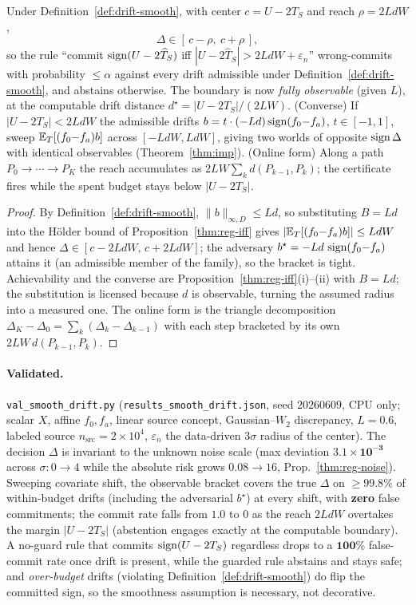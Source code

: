 \begin{proposition}\label{thm:smooth-drift}
Under Definition~\ref{def:drift-smooth}, with center $c=U-2T_S$ and reach
$\rho=2LdW$,
\[
\Delta\in[\,c-\rho,\ c+\rho\,],
\]
so the rule ``commit $\operatorname{sign}(U-2\widehat T_S)$ iff $|U-2\widehat T_S|>2LdW+
\varepsilon_n$'' wrong-commits with probability $\le\alpha$ against every drift
admissible under Definition~\ref{def:drift-smooth}, and abstains otherwise. The
boundary is now \emph{fully observable} (given $L$), at the computable drift
distance $d^\star=|U-2T_S|/(2LW)$. \textup{(Converse)} If $|U-2T_S|<2LdW$ the
admissible drifts $b=t\cdot(-Ld)\operatorname{sign}(f_0{-}f_a)$, $t\in[-1,1]$, sweep
$\mathbb{E}_T[(f_0{-}f_a)b]$ across $[-LdW,LdW]$, giving two worlds of opposite
$\operatorname{sign}\Delta$ with identical observables (Theorem~\ref{thm:imp}). \textup{(Online
form)} Along a path $P_0\!\to\!\cdots\!\to\!P_K$ the reach accumulates as
$2LW\sum_{k}d(P_{k-1},P_k)$; the certificate fires while the spent budget stays
below $|U-2T_S|$.
\end{proposition}
\begin{proof}
By Definition~\ref{def:drift-smooth}, $\|b\|_{\infty,D}\le Ld$, so substituting
$B=Ld$ into the H\"older bound of Proposition~\ref{thm:reg-iff} gives
$|\mathbb{E}_T[(f_0{-}f_a)b]|\le LdW$ and hence $\Delta\in[c-2LdW,\,c+2LdW]$; the
adversary $b^\star=-Ld\,\operatorname{sign}(f_0{-}f_a)$ attains it (an admissible member of the
family), so the bracket is tight. Achievability and the converse are
Proposition~\ref{thm:reg-iff}(i)--(ii) with $B=Ld$; the substitution is licensed
because $d$ is observable, turning the assumed radius into a measured one. The
online form is the triangle decomposition
$\Delta_K-\Delta_0=\sum_k(\Delta_k-\Delta_{k-1})$ with each step bracketed by its
own $2LW\,d(P_{k-1},P_k)$. \qedhere
\end{proof}

\paragraph{Validated.} \texttt{val\_smooth\_drift.py}
(\texttt{results\_smooth\_drift.json}, seed $20260609$, CPU only; scalar $X$,
affine $f_0,f_a$, linear source concept, Gaussian--$W_2$ discrepancy, $L{=}0.6$,
labeled source $n_{\mathrm{src}}{=}2{\times}10^4$, $\varepsilon_n$ the
data-driven $3\sigma$ radius of the center). The decision $\Delta$ is invariant
to the unknown noise scale (max deviation $\mathbf{3.1\times10^{-3}}$ across
$\sigma{:}0\to4$ while the absolute risk grows $0.08\to16$, Prop.~\ref{thm:reg-noise}).
Sweeping covariate shift, the observable bracket covers the true $\Delta$ on
$\ge\mathbf{99.8\%}$ of within-budget drifts (including the adversarial
$b^\star$) at every shift, with \textbf{zero} false commitments; the commit rate
falls from $1.0$ to $0$ as the reach $2LdW$ overtakes the margin $|U-2T_S|$
(abstention engages exactly at the computable boundary). A no-guard rule that
commits $\operatorname{sign}(U-2T_S)$ regardless drops to a $\mathbf{100\%}$ false-commit rate
once drift is present, while the guarded rule abstains and stays safe; and
\emph{over-budget} drifts (violating Definition~\ref{def:drift-smooth}) do flip
the committed sign, so the smoothness assumption is necessary, not decorative.

